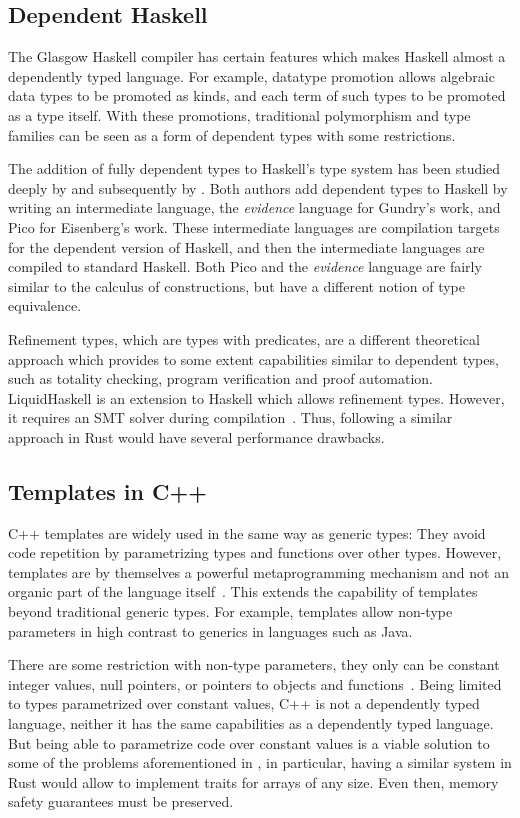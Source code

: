 \subsection{Dependent Haskell} 

The Glasgow Haskell compiler has certain features which makes Haskell almost a
dependently typed language. For example, datatype promotion allows algebraic
data types to be promoted as kinds, and each term of such types to be promoted
as a type itself. With these promotions, traditional polymorphism and type
families can be seen as a form of dependent types with some restrictions.

The addition of fully dependent types to Haskell's type system has been studied
deeply by \citet{gundry} and subsequently by \citet{eisenberg}. Both authors
add dependent types to Haskell by writing an intermediate language, the
\textit{evidence} language for Gundry's work, and Pico for Eisenberg's work.
These intermediate languages are compilation targets for the dependent version
of Haskell, and then the intermediate languages are compiled to standard
Haskell. Both Pico and the \textit{evidence} language are fairly similar to the
calculus of constructions, but have a different notion of type equivalence.

Refinement types, which are types with predicates, are a different theoretical
approach which provides to some extent capabilities similar to dependent types,
such as totality checking, program verification and proof automation.
LiquidHaskell is an extension to Haskell which allows refinement types. However,
it requires an SMT solver during compilation~\cite{liquidhaskell}. Thus,
following a similar approach in Rust would have several performance drawbacks.

\subsection{Templates in C++} 

C++ templates are widely used in the same way as generic types: They avoid code
repetition by parametrizing types and functions over other types. However,
templates are by themselves a powerful metaprogramming mechanism and not an
organic part of the language itself~\cite{template_metaprogramming}. This
extends the capability of templates beyond traditional generic types. For
example, templates allow non-type parameters in high contrast to generics in
languages such as Java.

There are some restriction with non-type parameters, they only can be constant
integer values, null pointers, or pointers to objects and
functions~\cite{templates}. Being limited to types parametrized over constant
values, C++ is not a dependently typed language, neither it has the same
capabilities as a dependently typed language. But being able to parametrize code
over constant values is a viable solution to some of the problems aforementioned
in , in particular, having a similar system in
Rust would allow to implement traits for arrays of any size. Even then, memory
safety guarantees must be preserved.

